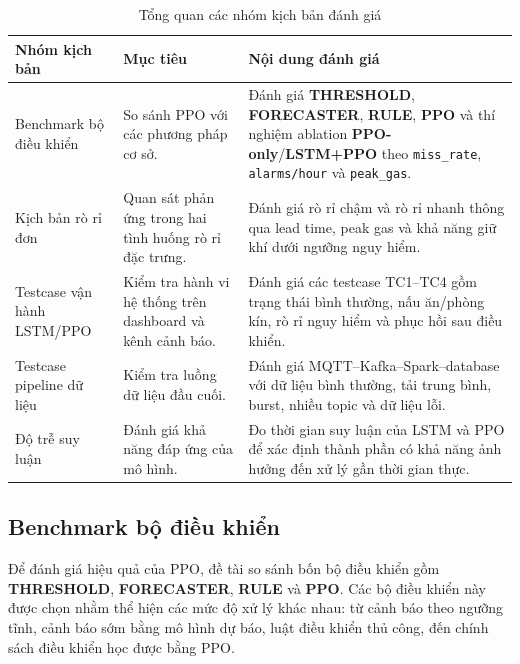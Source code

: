\begin{longtable}{
  >{\raggedright\arraybackslash}p{3.0cm}
  >{\raggedright\arraybackslash}p{4.0cm}
  >{\raggedright\arraybackslash}p{\dimexpr\textwidth+0.5cm-3.0cm-4.0cm-6\tabcolsep\relax}
}
\caption{Tổng quan các nhóm kịch bản đánh giá}
\label{tab:evaluation_scenario_groups} \\
\toprule
\textbf{Nhóm kịch bản} 
& \textbf{Mục tiêu} 
& \textbf{Nội dung đánh giá} \\
\midrule
\endfirsthead

\endhead

\endfoot

\bottomrule
\endlastfoot

Benchmark bộ điều khiển
& So sánh PPO với các phương pháp cơ sở.
& Đánh giá \textbf{THRESHOLD}, \textbf{FORECASTER}, \textbf{RULE}, \textbf{PPO} và thí nghiệm ablation \textbf{PPO-only}/\textbf{LSTM+PPO} theo \texttt{miss\_rate}, \texttt{alarms/hour} và \texttt{peak\_gas}. \\

Kịch bản rò rỉ đơn
& Quan sát phản ứng trong hai tình huống rò rỉ đặc trưng.
& Đánh giá rò rỉ chậm và rò rỉ nhanh thông qua lead time, peak gas và khả năng giữ khí dưới ngưỡng nguy hiểm. \\

Testcase vận hành LSTM/PPO
& Kiểm tra hành vi hệ thống trên dashboard và kênh cảnh báo.
& Đánh giá các testcase TC1--TC4 gồm trạng thái bình thường, nấu ăn/phòng kín, rò rỉ nguy hiểm và phục hồi sau điều khiển. \\

Testcase pipeline dữ liệu
& Kiểm tra luồng dữ liệu đầu cuối.
& Đánh giá MQTT--Kafka--Spark--database với dữ liệu bình thường, tải trung bình, burst, nhiều topic và dữ liệu lỗi. \\

Độ trễ suy luận
& Đánh giá khả năng đáp ứng của mô hình.
& Đo thời gian suy luận của LSTM và PPO để xác định thành phần có khả năng ảnh hưởng đến xử lý gần thời gian thực. \\

\end{longtable}
\endgroup

\subsection{Benchmark bộ điều khiển}

Để đánh giá hiệu quả của PPO, đề tài so sánh bốn bộ điều khiển gồm \textbf{THRESHOLD}, \textbf{FORECASTER}, \textbf{RULE} và \textbf{PPO}. Các bộ điều khiển này được chọn nhằm thể hiện các mức độ xử lý khác nhau: từ cảnh báo theo ngưỡng tĩnh, cảnh báo sớm bằng mô hình dự báo, luật điều khiển thủ công, đến chính sách điều khiển học được bằng PPO.

